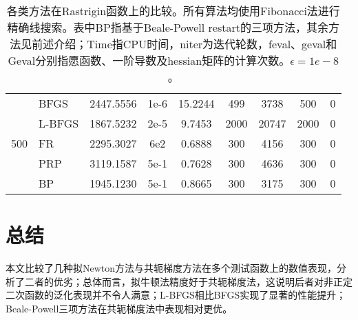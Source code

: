 \documentclass{article}
\begin{document}
\begin{table*}[t]
\begin{tabular}{c l c c c c c c c}
    \cmidrule(lr){1-9}
    \multirow{5}{*}{500} &
    BFGS & 2447.5556 & 1e-6 & 15.2244 & 499 & 3738 & 500 & 0 \\
    & L-BFGS & 1867.5232 & 2e-5 & 9.7453 & 2000 & 20747 & 2000 & 0 \\
    & FR & 2295.3027 & 6e2 & 0.6888 & 300 & 4156 & 300 & 0 \\
    & PRP & 3119.1587 & 5e-1 & 0.7628 & 300 & 4636 & 300 & 0 \\
    & BP & 1945.1230 & 5e-1 & 0.8665 & 300 & 3175 & 300 & 0 \\
    \bottomrule
  \end{tabular}
  \caption{各类方法在Rastrigin函数上的比较。所有算法均使用Fibonacci法进行精确线搜索。表中BP指基于Beale-Powell restart的三项方法，其余方法见前述介绍；Time指CPU时间，niter为迭代轮数，feval、geval和Geval分别指愿函数、一阶导数及hessian矩阵的计算次数。$\epsilon=1e-8$。}
  \label{tab:rastrigin}
\end{table*}


\section{总结}
本文比较了几种拟Newton方法与共轭梯度方法在多个测试函数上的数值表现，分析了二者的优劣；总体而言，拟牛顿法精度好于共轭梯度法，这说明后者对非正定二次函数的泛化表现并不令人满意；L-BFGS相比BFGS实现了显著的性能提升；Beale-Powell三项方法在共轭梯度法中表现相对更优。


\end{document}
